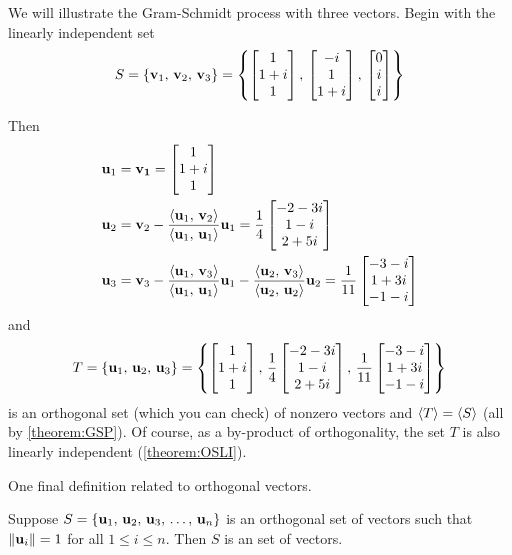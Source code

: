\documentclass{ximera}
\begin{document}
\begin{example}

  We will illustrate the Gram-Schmidt process with three vectors.  Begin with the linearly independent set
  \[
    S=\left\{\mathbf{v}_1,\,\mathbf{v}_2,\,\mathbf{v}_3\right\}=\left\{
      \begin{bmatrix}1\\1+i\\1\end{bmatrix},\,
      \begin{bmatrix}-i\\1\\1+i\end{bmatrix},\,
      \begin{bmatrix}0\\i\\i\end{bmatrix}
    \right\}
  \]
  
  Then
  \begin{align*}
    \mathbf{u}_1&=\mathbf{v_1}=\begin{bmatrix}1\\1+i\\1\end{bmatrix}\\
    \mathbf{u}_2&=\mathbf{v}_2
                -\frac{\left\langle\mathbf{u}_1,\,\mathbf{v}_2\right\rangle}{\left\langle\mathbf{u}_1,\,\mathbf{u}_1\right\rangle}\mathbf{u}_1
                =\frac{1}{4}\begin{bmatrix}-2-3i\\1-i\\2+5i\end{bmatrix}\\
    \mathbf{u}_3&=\mathbf{v}_3
                -\frac{\left\langle\mathbf{u}_1,\,\mathbf{v}_3\right\rangle}{\left\langle\mathbf{u}_1,\,\mathbf{u}_1\right\rangle}\mathbf{u}_1
                -\frac{\left\langle\mathbf{u}_2,\,\mathbf{v}_3\right\rangle}{\left\langle\mathbf{u}_2,\,\mathbf{u}_2\right\rangle}\mathbf{u}_2
                =\frac{1}{11}\begin{bmatrix}-3-i\\1+3i\\-1-i\end{bmatrix}
  \end{align*}
  and
  \[
    T=\left\{\mathbf{u}_1,\,\mathbf{u}_2,\,\mathbf{u}_3\right\}
    =\left\{
      \begin{bmatrix}1\\1+i\\1\end{bmatrix},\,
      \frac{1}{4}\begin{bmatrix}-2-3i\\1-i\\2+5i\end{bmatrix},\,
      \frac{1}{11}\begin{bmatrix}-3-i\\1+3i\\-1-i\end{bmatrix}
    \right\}
  \]
  is an orthogonal set (which you can check) of nonzero vectors and
  $\left\langle T\right\rangle=\left\langle S\right\rangle$ (all by \ref{theorem:GSP}).  Of course, as a
  by-product of orthogonality, the set $T$ is also linearly
  independent (\ref{theorem:OSLI}).

\end{example}

One final definition related to orthogonal vectors.

\begin{definition}

  Suppose $S=\left\{\mathbf{u}_{1},\,\mathbf{u}_{2},\,\mathbf{u}_{3},\,\ldots,\,\mathbf{u}_{n}\right\}$ is an orthogonal set of vectors
  such that $\left\lVert\mathbf{u}_i\right\rVert=1$ for all $1\leq i\leq n$.  Then $S$
  is an  set of vectors.

\end{definition}
\end{document}
